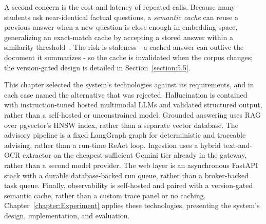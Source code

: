 \documentclass[../main.tex]{subfiles}
\begin{document}
A second concern is the cost and latency of repeated calls.
Because many students ask near-identical factual questions, a \textit{semantic cache} can reuse a previous answer when a new question is close enough in embedding space, generalizing an exact-match cache by accepting a stored answer within a similarity threshold~\cite{bang2023gptcache}.
The risk is staleness - a cached answer can outlive the document it summarizes - so the cache is invalidated when the corpus changes; the version-gated design is detailed in Section~\ref{section:5.5}.

This chapter selected the system's technologies against its requirements, and in each case named the alternative that was rejected.
Hallucination is contained with instruction-tuned hosted multimodal \gls{LLM}s and validated structured output, rather than a self-hosted or unconstrained model.
Grounded answering uses \gls{RAG} over pgvector's \gls{HNSW} index, rather than a separate vector database.
The advisory pipeline is a fixed LangGraph graph for deterministic and traceable advising, rather than a run-time ReAct loop.
Ingestion uses a hybrid text-and-\gls{OCR} extractor on the cheapest sufficient Gemini tier already in the gateway, rather than a second model provider.
The web layer is an asynchronous FastAPI stack with a durable database-backed run queue, rather than a broker-backed task queue.
Finally, observability is self-hosted and paired with a version-gated semantic cache, rather than a custom trace panel or no caching.
Chapter~\ref{chapter:Experiment} applies these technologies, presenting the system's design, implementation, and evaluation.
\end{document}
